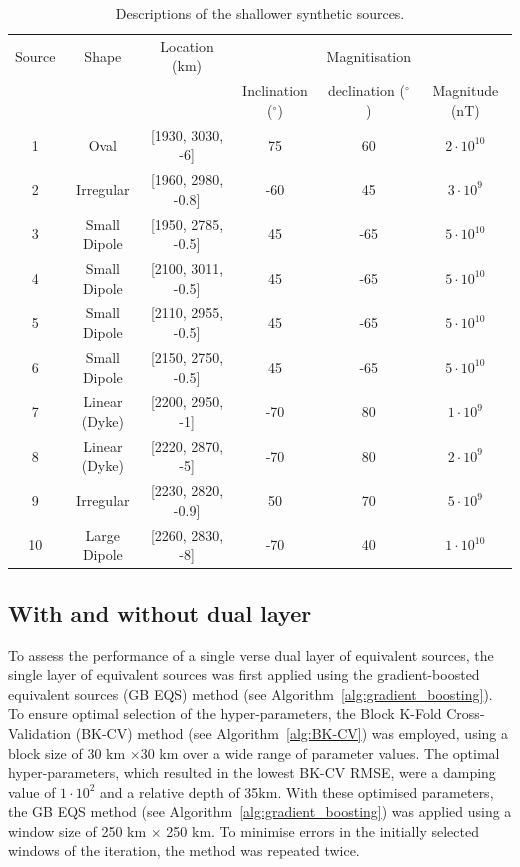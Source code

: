 \begin{table}[hbt!]
\centering
\begin{tabular}{c c c c c c}
\hline
Source & Shape & Location (km) &  & Magnitisation & \\
\cline{4-6}
 &  &  & Inclination ($^\circ$) & declination ($^\circ$) & Magnitude (nT) \\
\hline
1 & Oval & [1930, 3030, -6] & 75 & 60 & $2 \cdot 10^{10}$ \\
2 & Irregular & [1960, 2980, -0.8] & -60 & 45 & $3 \cdot 10^{9}$ \\
3 & Small Dipole & [1950, 2785, -0.5] & 45 & -65 & $5 \cdot 10^{10}$ \\
4 & Small Dipole	& [2100, 3011, -0.5] & 45 & -65 & $5 \cdot 10^{10}$ \\
5 & Small Dipole & [2110, 2955, -0.5] & 45 & -65 & $5 \cdot 10^{10}$ \\
6 & Small Dipole & [2150, 2750, -0.5] & 45 & -65 & $5 \cdot 10^{10}$ \\
7 &	Linear (Dyke) & [2200, 2950, -1] & -70 & 80 & $1 \cdot 10^{9}$ \\
8 & Linear (Dyke) & [2220, 2870, -5] & -70 & 80 & $2 \cdot 10^{9}$ \\
9 & Irregular & [2230, 2820, -0.9] & 50 & 70 & $5 \cdot 10^{9}$ \\
10 & Large Dipole & [2260, 2830, -8] & -70 & 40 & $1 \cdot 10^{10}$ \\
\hline
\end{tabular}
\caption{Descriptions of the shallower synthetic sources.}
\label{table:shallow_sources}
\end{table}

\subsection{With and without dual layer}
\label{sec:single_vs_dual}
To assess the performance of a single verse dual layer of equivalent sources, the single layer of equivalent sources was first applied using the gradient-boosted equivalent sources (GB EQS) method (see Algorithm~\ref{alg:gradient_boosting}). To ensure optimal selection of the hyper-parameters, the Block K-Fold Cross-Validation (BK-CV) method (see Algorithm~\ref{alg:BK-CV}) was employed, using a block size of 30 km $\times$30 km over a wide range of parameter values. The optimal hyper-parameters, which resulted in the lowest BK-CV RMSE, were a damping value of $1 \cdot 10^{2}$ and a relative depth of 35km. With these optimised parameters, the GB EQS method (see Algorithm~\ref{alg:gradient_boosting}) was applied using a window size of 250 km $\times$ 250 km. To minimise errors in the initially selected windows of the iteration, the method was repeated twice. 

